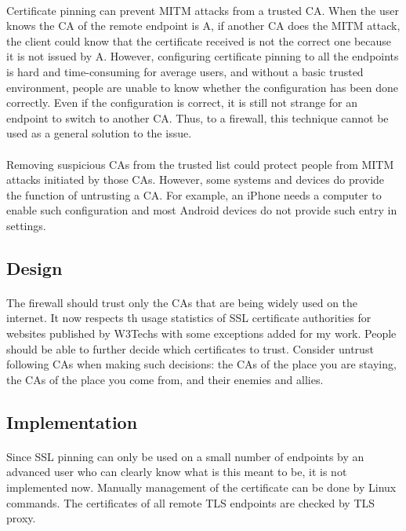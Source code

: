\documentclass[mscthesis]{usiinfthesis}
\begin{document}
\paragraph{}
Certificate pinning can prevent MITM attacks from a trusted CA. When the user knows the CA of the remote endpoint is A, if another CA does the MITM attack, the client could know that the certificate received is not the correct one because it is not issued by A. However, configuring certificate pinning to all the endpoints is hard and time-consuming for average users, and without a basic trusted environment, people are unable to know whether the configuration has been done correctly. Even if the configuration is correct, it is still not strange for an endpoint to switch to another CA. Thus, to a firewall, this technique cannot be used as a general solution to the issue.
\paragraph{}
Removing suspicious CAs from the trusted list could protect people from MITM attacks initiated by those CAs. However, some systems and devices do provide the function of untrusting a CA. For example, an iPhone needs a computer to enable such configuration and most Android devices do not provide such entry in settings.
\subsection{Design}
\paragraph{}
The firewall should trust only the CAs that are being widely used on the internet. It now respects th usage statistics of SSL certificate authorities for websites published by W3Techs \citep{cert:stat} with some exceptions added for my work. People should be able to further decide which certificates to trust. Consider untrust following CAs when making such decisions: the CAs of the place you are staying, the CAs of the place you come from, and their enemies and allies.
\subsection{Implementation}
\paragraph{}
Since SSL pinning can only be used on a small number of endpoints by an advanced user who can clearly know what is this meant to be, it is not implemented now. Manually management of the certificate can be done by Linux commands. The certificates of all remote TLS endpoints are checked by TLS proxy.
\end{document}
